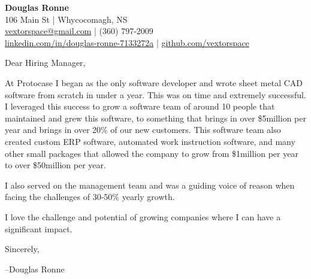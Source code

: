 \documentclass[letter,12pt]{article}
\begin{document}
\begin{center}
    {\Huge \textbf{Douglas Ronne}}\\
    \vspace{2mm}
    106 Main St | Whycocomagh, NS\\
    \href{mailto:vextorspace@gmail.com}{vextorspace@gmail.com} | (360) 797-2009\\
    \href{www.linkedin.com/in/douglas-ronne-7133272a}{linkedin.com/in/douglas-ronne-7133272a} | \href{https://github.com/vextorspace}{github.com/vextorspace}
\end{center}

Dear Hiring Manager,

\vspace{.5cm}
\noindent
At Protocase I began as the only software developer and wrote sheet metal CAD software from scratch in under a year. This was on time and extremely successful. I leveraged this success to grow a software team of around 10 people that maintained and grew this software, to something that brings in over \$5million per year and brings in over 20\% of our new customers. This software team also created custom ERP software, automated work instruction software, and many other small packages that allowed the company to grow from \$1million per year to over \$50million per year.

\vspace{.5cm}
\noindent
I also served on the management team and was a guiding voice of reason when facing the challenges of 30-50\% yearly growth.

\vspace{.5cm}
\noindent
I love the challenge and potential of growing companies where I can have a significant impact.

\vspace{1cm}
\noindent
Sincerely,

\noindent
--Douglas Ronne
\end{document}
